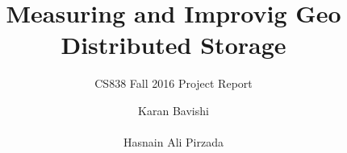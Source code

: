 \documentclass{sig-alternate-05-2015}
\begin{document}






%

\title{Measuring and Improvig Geo Distributed Storage}
\subtitle{CS838 Fall 2016 Project Report}
%
%
%
%
%

%
\author{
%
%
\alignauthor
Karan Bavishi \\
       \\
\alignauthor
Hasnain Ali Pirzada\\
\\
}
\end{document}
